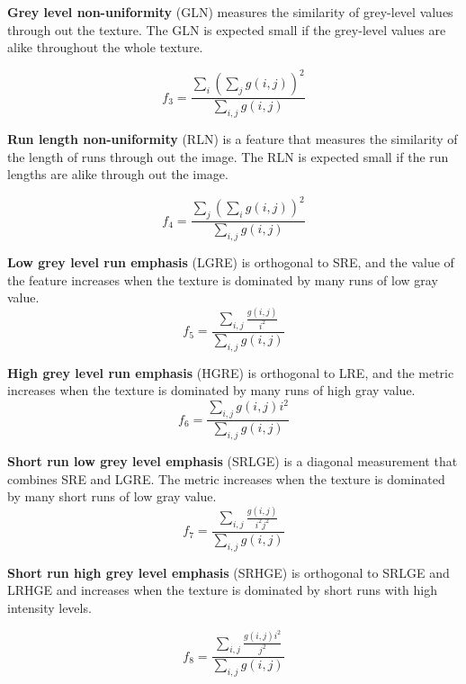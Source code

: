 \documentclass{InsightArticle}
\begin{document}
\textbf{Grey level non-uniformity} (GLN) measures the similarity of grey-level values through out the texture. The GLN is expected small if the grey-level values are alike throughout the whole texture.

\begin{equation} \label{eqn:ShapeInfluenceTerm}
f_3 = \frac{\sum_{i}\nolimits (\sum_{j}\nolimits g(i, j))^2}{\sum_{i,j}\nolimits g(i, j)}
\end{equation}

\textbf{Run length non-uniformity} (RLN) is a feature that measures the similarity of the length of runs through out the image. The RLN is expected small if the run lengths are alike through out the image.

\begin{equation} \label{eqn:ShapeInfluenceTerm}
f_4 = \frac{\sum_{j}\nolimits (\sum_{i}\nolimits g(i, j))^2}{\sum_{i,j}\nolimits g(i, j)}
\end{equation}

\textbf{Low grey level run emphasis} (LGRE) is orthogonal to SRE, and the value of the feature increases when the texture is dominated by many runs of low gray value.
\begin{equation} \label{eqn:ShapeInfluenceTerm}
f_5 = \frac{\sum_{i,j}\nolimits \frac{g(i, j)}{i^2}}{\sum_{i,j}\nolimits g(i, j)}
\end{equation}

\textbf{High grey level run emphasis} (HGRE) is orthogonal to LRE, and the metric increases when the texture is dominated by many runs of high gray value.
\begin{equation} \label{eqn:ShapeInfluenceTerm}
f_6 = \frac{\sum_{i,j}\nolimits g(i, j)i^2}{\sum_{i,j}\nolimits g(i, j)}
\end{equation}

\textbf{Short run low grey level emphasis} (SRLGE) is a diagonal measurement that combines SRE and LGRE. The metric increases when the texture is dominated by many short runs of low gray value.
\begin{equation} \label{eqn:ShapeInfluenceTerm}
f_7 = \frac{\sum_{i,j}\nolimits \frac{g(i, j)}{i^2j^2}}{\sum_{i,j}\nolimits g(i, j)}
\end{equation}

\textbf{Short run high grey level emphasis} (SRHGE) is orthogonal to SRLGE and LRHGE and increases when the texture is dominated by short runs with high intensity levels.

\begin{equation} \label{eqn:ShapeInfluenceTerm}
f_8 = \frac{\sum_{i,j}\nolimits \frac{g(i, j)i^2}{j^2}}{\sum_{i,j}\nolimits g(i, j)}
\end{equation}
\end{document}
